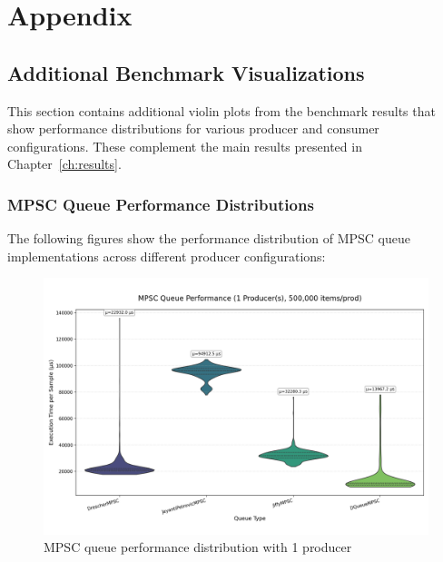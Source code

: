 \chapter{Appendix}

\section{Additional Benchmark Visualizations}
This section contains additional violin plots from the benchmark results that show performance distributions for various producer and consumer configurations. These complement the main results presented in Chapter~\ref{ch:results}.

\subsection{MPSC Queue Performance Distributions}\label{subsec:mpsc-violin}
The following figures show the performance distribution of MPSC queue implementations across different producer configurations:

\begin{figure}[H]
\centering
\caption{MPSC queue performance distribution with 1 producer}
\label{fig:mpsc-violin-1p}
\includegraphics[width=\textwidth]{images/results/mpsc_performance_violin_1_producers.png}
\end{figure}

